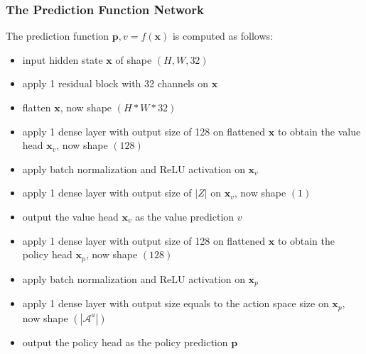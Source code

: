 \subsubsection{The Prediction Function Network}
The prediction function $\mathbf{p}, v = f(\mathbf{x})$ is computed as follows:
\begin{itemize}
    \item input hidden state $\mathbf{x}$ of shape $(H, W, 32)$
    \item apply 1 residual block with 32 channels on $\mathbf{x}$
    \item flatten $\mathbf{x}$, now shape $(H * W * 32)$
    \item apply 1 dense layer with output size of 128 on flattened $\mathbf{x}$ to obtain the value head $\mathbf{x}_v$, now shape $(128)$
    \item apply batch normalization and ReLU activation on $\mathbf{x}_v$
    \item apply 1 dense layer with output size of $|Z|$ on $\mathbf{x}_v$, now shape $(1)$
    \item output the value head $\mathbf{x}_v$ as the value prediction $v$
    \item apply 1 dense layer with output size of 128 on flattened $\mathbf{x}$ to obtain the policy head $\mathbf{x}_p$, now shape $(128)$
    \item apply batch normalization and ReLU activation on $\mathbf{x}_p$
    \item apply 1 dense layer with output size equals to the action space size on $\mathbf{x}_p$, now shape $(|\mathcal{A}^a|)$
    \item output the policy head as the policy prediction $\mathbf{p}$
\end{itemize}

